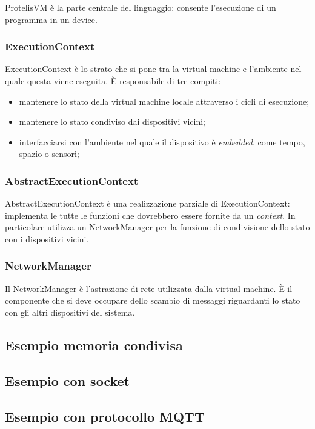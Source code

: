 \documentclass{article}
\begin{document}
ProtelisVM è la parte centrale del linguaggio: consente l'esecuzione di un programma in un device.

\subsubsection{ExecutionContext}

ExecutionContext è lo strato che si pone tra la virtual machine e l'ambiente nel quale questa viene eseguita. È responsabile di tre compiti:

\begin{itemize}
    \item{mantenere lo stato della virtual machine locale attraverso i cicli di esecuzione;}

    \item{mantenere lo stato condiviso dai dispositivi vicini;}

    \item{interfacciarsi con l'ambiente nel quale il dispositivo è \textit{embedded}, come tempo, spazio o sensori;}
\end{itemize}

\subsubsection{AbstractExecutionContext}

AbstractExecutionContext è una realizzazione parziale di ExecutionContext: implementa le tutte le funzioni che dovrebbero essere fornite da un \textit{context}. In particolare utilizza un NetworkManager per la funzione di condivisione dello stato con i dispositivi vicini.

\subsubsection{NetworkManager}

Il NetworkManager è l'astrazione di rete utilizzata dalla virtual machine. È il componente che si deve occupare dello scambio di messaggi riguardanti lo stato con gli altri dispositivi del sistema.

\subsection{Esempio memoria condivisa}

\subsection{Esempio con socket}

\subsection{Esempio con protocollo MQTT}
\end{document}
